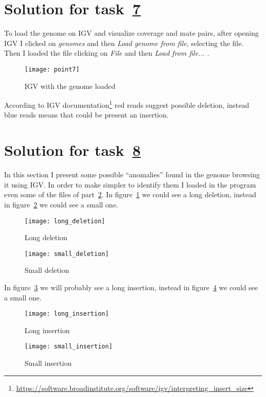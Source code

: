 \section{Solution for task~\hyperref[itm:1.7]{7}}
To load the genome on IGV and visualize coverage and mate pairs, after opening 
IGV I clicked on \textit{genomes} and then \textit{Load genome from file},
selecting the  file. Then I loaded
the  file clicking on \textit{File} and then 
\textit{Load from file...} .
\begin{figure}[H]
\texttt{[image: point7]}
\caption{IGV with the genome loaded}
\end{figure}
According to IGV documentation\footnote{
\url{https://software.broadinstitute.org/software/igv/interpreting_insert_size}}
red reads suggest possible deletion, instead blue reads means that could be
present an insertion.

\section{Solution for task~\hyperref[itm:1.8]{8}}
In this section I present some possible ``anomalies'' found in the genome
browsing it using IGV. In order to make simpler to identify them I loaded in
the program even some of the  files of part~\hyperref[chp:part2]{2}.
In figure~\ref{fig:longdel} we could see a long deletion, instead in
figure~\ref{fig:smalldel} we could see a small one.
\begin{figure}[H]
\texttt{[image: long\_deletion]}
\caption{Long deletion}
\label{fig:longdel}
\end{figure}

\begin{figure}[H]
\texttt{[image: small\_deletion]}
\caption{Small deletion}
\label{fig:smalldel}
\end{figure}

In figure~\ref{fig:longins} we will probably see a long insertion, instead in
figure~\ref{fig:smallins} we could see a small one.
\begin{figure}[H]
\texttt{[image: long\_insertion]}
\caption{Long insertion}
\label{fig:longins}
\end{figure}

\begin{figure}[H]
\texttt{[image: small\_insertion]}
\caption{Small insertion}
\label{fig:smallins}
\end{figure}